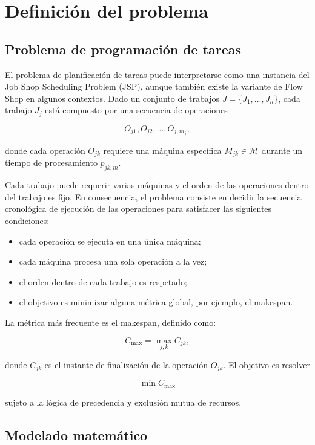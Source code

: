 \documentclass[11pt,a4paper]{article}
\begin{document}
\section{Definición del problema}

\subsection{Problema de programación de tareas}

El problema de planificación de tareas puede interpretarse como una instancia del Job Shop Scheduling Problem (JSP), aunque también existe la variante de Flow Shop en algunos contextos. Dado un conjunto de trabajos $J = \{J_1, \dots, J_n\}$, cada trabajo $J_j$ está compuesto por una secuencia de operaciones

$$
O_{j1}, O_{j2}, \dots, O_{j,m_j},
$$

donde cada operación $O_{jk}$ requiere una máquina específica $M_{jk} \in \mathcal{M}$ durante un tiempo de procesamiento $p_{jk,m}$.

Cada trabajo puede requerir varias máquinas y el orden de las operaciones dentro del trabajo es fijo. En consecuencia, el problema consiste en decidir la secuencia cronológica de ejecución de las operaciones para satisfacer las siguientes condiciones:

\begin{itemize}
    \item cada operación se ejecuta en una única máquina;
    \item cada máquina procesa una sola operación a la vez;
    \item el orden dentro de cada trabajo es respetado;
    \item el objetivo es minimizar alguna métrica global, por ejemplo, el makespan.
\end{itemize}

La métrica más frecuente es el makespan, definido como:

$$
C_{\max} = \max_{j,k} C_{jk},
$$

donde $C_{jk}$ es el instante de finalización de la operación $O_{jk}$. El objetivo es resolver

$$
\min C_{\max}
$$

sujeto a la lógica de precedencia y exclusión mutua de recursos.

\subsection{Modelado matemático}
\end{document}
